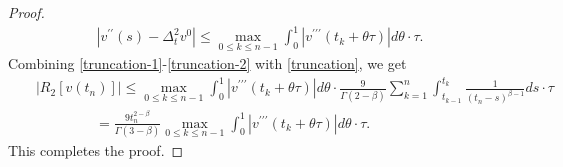 \documentclass[11pt]{article}
\newenvironment{proofed}{\begin{proof}}{\end{proof}}
\begin{document}
\begin{proofed}
\begin{eqnarray}
 |v^{\prime\prime}(s)-\Delta_t^2 v^{0}|\leq \max_{0\leq k\leq n-1}\int_{0}^{1}|v^{\prime\prime\prime}(t_{k}+\theta \tau)|d\theta\cdot \tau. \label{truncation-2}
\end{eqnarray}
Combining  \eqref{truncation-1}-\eqref{truncation-2} with \eqref{truncation}, we get
\begin{eqnarray}
&& |R_2[v(t_n)]| \leq  \max_{0\leq k\leq n-1}\int_{0}^{1}|v^{\prime\prime\prime}(t_{k}+\theta \tau)|d\theta \cdot \frac{9}{\Gamma{(2-\beta)} } \sum_{k=1}^n \int_{t_{k-1}}^{t_k} \frac{1}{(t_n-s)^{\beta-1}}ds \cdot \tau
\nonumber \\
&&\qquad\qquad~
 = \frac{9t_n^{2-\beta}}{\Gamma{(3-\beta)}} \max_{0\leq k\leq n-1}\int_{0}^{1}|v^{\prime\prime\prime}(t_{k}+\theta \tau)|d\theta \cdot \tau.
\end{eqnarray}
This completes the proof.
\end{proofed}
\end{document}
